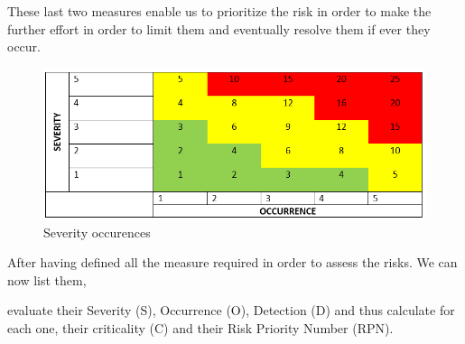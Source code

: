 These last two measures enable us to prioritize the risk in order to
make the further effort in order to limit them and eventually resolve
them if ever they occur.

\begin{figure}[h]
\centering
\includegraphics[scale=0.7]{Img/severity-occurrence.png}
\caption{Severity occurences}
\end{figure}

After having defined all the measure required in order to assess the risks. We can now list them,  

evaluate their Severity (S), Occurrence (O), Detection (D) and thus calculate for each one, their criticality (C) and their Risk Priority Number (RPN). 

